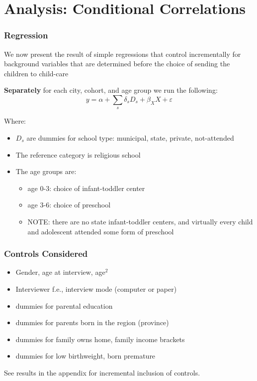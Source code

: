 \documentclass{beamer}
\begin{document}
\section{Analysis: Conditional Correlations}
\begin{frame}\frametitle{Regression}
We now present the result of simple regressions that control incrementally for background variables that are determined before the choice of sending the children to child-care

\vspace{2ex}

\textbf{Separately} for each city, cohort, and age group we run the following:
\[ 
y = \alpha + \sum_{s} \delta_{s} D_{s} + \beta_{X}X + \varepsilon
\]

Where:
\begin{itemize}
	\item $D_{s}$ are dummies for school type: municipal, state, private, not-attended
	\item The reference category is religious school
	\item The age groups are:
	\begin{itemize}
		\item age 0-3: choice of infant-toddler center 
		\item age 3-6: choice of preschool
		\item NOTE: there are no state infant-toddler centers, and virtually every child and adolescent attended some form of preschool
	\end{itemize}
\end{itemize}
\end{frame}

\begin{frame}\frametitle{Controls Considered}
	\begin{itemize}
		\item Gender, age at interview, age$^2$
		\item Interviewer f.e., interview mode (computer or paper)
		\item dummies for parental education
		\item dummies for parents born in the region (province)
		\item dummies for family owns home, family income brackets
		\item dummies for low birthweight, born premature	
	\end{itemize}
\vspace{3ex}
\footnotesize See results in the appendix for incremental inclusion of controls.
\end{frame}
\end{document}
